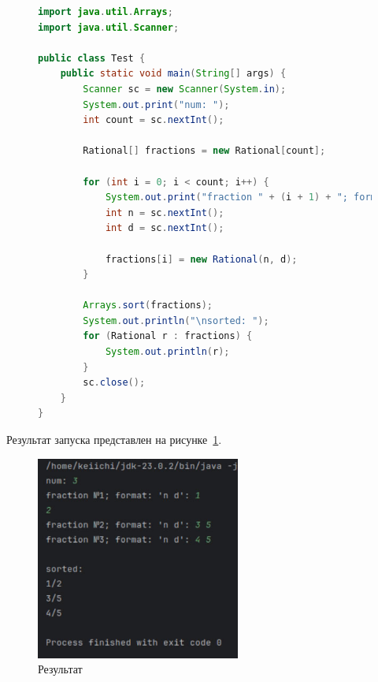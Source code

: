 \documentclass[a4paper, 14pt]{extarticle}
\begin{document}
\begin{figure}[!htb]
\begin{lstlisting}[language={java},caption={Файл Test.java},label={lst:code2}]
import java.util.Arrays;
import java.util.Scanner;

public class Test {
    public static void main(String[] args) {
        Scanner sc = new Scanner(System.in);
        System.out.print("num: ");
        int count = sc.nextInt();

        Rational[] fractions = new Rational[count];

        for (int i = 0; i < count; i++) {
            System.out.print("fraction " + (i + 1) + "; format: 'n d': ");
            int n = sc.nextInt();
            int d = sc.nextInt();

            fractions[i] = new Rational(n, d);
        }

        Arrays.sort(fractions);
        System.out.println("\nsorted: ");
        for (Rational r : fractions) {
            System.out.println(r);
        }
        sc.close();
    }
}
\end{lstlisting}
\end{figure}


Результат запуска представлен на рисунке~\ref{fig:img1}.

\begin{figure}[!htb]
	\centering
	\includegraphics[width=0.6\textwidth]{img1}
\caption{Результат}
\label{fig:img1}
\end{figure}
\end{document}

